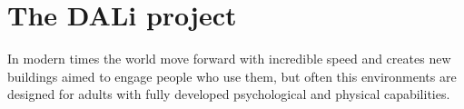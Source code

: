 \chapter{The DALi project}

In modern times the world move forward with incredible speed and creates new buildings aimed to engage people who use them, but often this environments are designed for adults with fully developed psychological and physical capabilities.   

